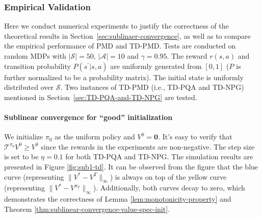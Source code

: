 \documentclass[10pt]{article}
\newcommand{\calA}{\mathcal{A}}
\newcommand{\calS}{\mathcal{S}}
\theoremstyle{plain}
\theoremstyle{definition}
\begin{document}
\subsubsection{Empirical Validation}
\label{sec:numerical-simulations}
Here we conduct numerical experiments to justify the correctness of the theoretical results in Section~\ref{sec:sublinaer-convergence}, 
 {as well as to compare the empirical performance of PMD and TD-PMD}. Tests are conducted on random MDPs with $|\calS| = 50$, $|\calA| = 10$ and $\gamma=0.95$. The reward $r(s,a)$ and transition probability $P(s^\prime | s,a)$ are uniformly generated from $[0,1]$ ($P$ is further normalized to be a probability matrix). The initial state  is uniformly distributed over $\calS$. Two instances of TD-PMD (i.e., TD-PQA and TD-NPG) mentioned in Section~\ref{sec:TD-PQA-and-TD-NPG} are tested.


\paragraph{Sublinear convergence for ``good'' initialization}  We initialize $\pi_0$ as the uniform policy and $V^0=\textbf{0}$. It's easy to verify that $
\mathcal{T} ^{\pi _0}V^0\ge V^0$ since the rewards in the experiments are non-negative. The step size is set to be $\eta=0.1$ for both TD-PQA and TD-NPG. The simulation results are presented in Figure \ref{fig:sub1-td}. It can be observed from the figure that the blue curve (representing $\|V^*-V^T\|_\infty$) is always on top of the yellow curve (representing $\|V^*-V^{\pi_T}\|_\infty$). Additionally, both curves decay to zero, which demonstrates the correctness of Lemma \ref{lem:monotonicity-property} and Theorem \ref{thm:sublinear-convergence-value-spec-init}.
\end{document}
